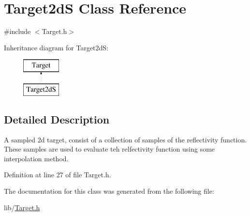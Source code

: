 \hypertarget{class_target2d_s}{}\section{Target2dS Class Reference}
\label{class_target2d_s}


{\ttfamily \#include $<$Target.\+h$>$}

Inheritance diagram for Target2dS\+:\begin{figure}[H]
\begin{center}
\leavevmode
\includegraphics[height=2.000000cm]{class_target2d_s}
\end{center}
\end{figure}


\subsection{Detailed Description}
A sampled 2d target, consist of a collection of samples of the reflectivity function. These samples are used to evaluate teh relfectivity function using some interpolation method. 

Definition at line 27 of file Target.\+h.



The documentation for this class was generated from the following file\+:\begin{DoxyCompactItemize}
\item 
lib/\hyperlink{_target_8h}{Target.\+h}\end{DoxyCompactItemize}
